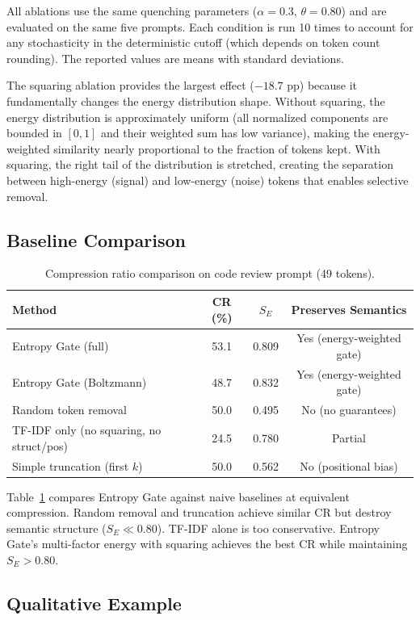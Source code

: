 \documentclass[11pt]{article}
\theoremstyle{remark}
\begin{document}
All ablations use the same quenching parameters ($\alpha = 0.3$,
$\theta = 0.80$) and are evaluated on the same five prompts. Each
condition is run 10 times to account for any stochasticity in the
deterministic cutoff (which depends on token count rounding). The
reported values are means with standard deviations.

The squaring ablation provides the largest effect ($-18.7$ pp) because
it fundamentally changes the energy distribution shape. Without squaring,
the energy distribution is approximately uniform (all normalized
components are bounded in $[0,1]$ and their weighted sum has low
variance), making the energy-weighted similarity nearly proportional
to the fraction of tokens kept. With squaring, the right tail of the
distribution is stretched, creating the separation between high-energy
(signal) and low-energy (noise) tokens that enables selective removal.

\subsection{Baseline Comparison}

\begin{table}[H]
\centering
\caption{Compression ratio comparison on code review prompt (49 tokens).}
\label{tab:baseline}
\begin{tabular}{lccc}
\toprule
Method & CR (\%) & $S_E$ & Preserves Semantics \\
\midrule
Entropy Gate (full)      & 53.1 & 0.809 & Yes (energy-weighted gate) \\
Entropy Gate (Boltzmann) & 48.7 & 0.832 & Yes (energy-weighted gate) \\
Random token removal     & 50.0 & 0.495 & No (no guarantees) \\
TF-IDF only (no squaring, no struct/pos) & 24.5 & 0.780 & Partial \\
Simple truncation (first $k$) & 50.0 & 0.562 & No (positional bias) \\
\bottomrule
\end{tabular}
\end{table}

Table~\ref{tab:baseline} compares Entropy Gate against naive baselines at
equivalent compression. Random removal and truncation achieve similar CR
but destroy semantic structure ($S_E \ll 0.80$). TF-IDF alone is too
conservative. Entropy Gate's multi-factor energy with squaring achieves
the best CR while maintaining $S_E > 0.80$.

\subsection{Qualitative Example}
\end{document}
